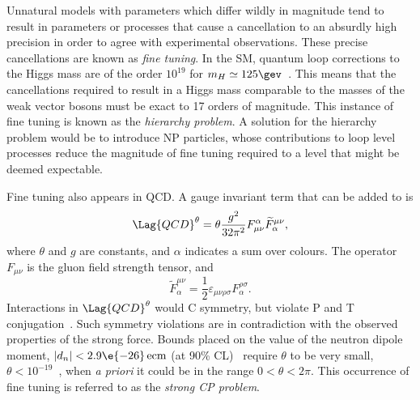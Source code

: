 Unnatural models with parameters which differ wildly in magnitude tend to
result in parameters or processes that cause a cancellation to an absurdly
high precision in order to agree with experimental observations.
These precise cancellations are known as \emph{fine tuning}.
In the SM, quantum loop corrections to the Higgs mass are of the order $10^{19}$
for $m_H\simeq125\gev$~\cite{Chatrchyan:2012ufa,Aad:2012tfa}.
This means that the cancellations required to result in a Higgs mass comparable to the masses of
the weak vector bosons must be exact to 17 orders of magnitude.
This instance of fine tuning is known as the \emph{hierarchy problem}.
A solution for the hierarchy problem would be to introduce NP particles, whose contributions to
loop level processes reduce the magnitude of fine tuning required to a level that might be deemed
expectable.

Fine tuning also appears in QCD.
A gauge invariant term that can be added to  is
\begin{equation}
  \Lag{QCD}^\theta = \theta\frac{g^2}{32\pi^2}
  F_{\mu\nu}^\alpha\widetilde F^{\mu\nu}_\alpha,
  \label{eq:strongcp}
\end{equation}
where $\theta$ and $g$ are constants, and $\alpha$ indicates a sum over colours.
The operator $F_{\mu\nu}$ is the gluon field strength tensor, and
\begin{equation}
  \widetilde F^{\mu\nu}_\alpha = \frac12\varepsilon_{\mu\nu\rho\sigma}F^{\rho\sigma}_\alpha.
\end{equation}
Interactions in $\Lag{QCD}^\theta$ would C symmetry, but violate P and T
conjugation~\cite{Peccei:2006as}.
Such symmetry violations are in contradiction with the observed properties of the strong
force.
Bounds placed on the value of the neutron dipole moment, $|d_n| <2.9\e{-26}\,\mathrm{ecm}$
(at 90\% CL)~\cite{Baker:2006ts} require $\theta$ to be very small,
$\theta<10^{-19}$~\cite{Crewther:PQref9}, when \emph{a priori} it could be in the range
$0<\theta<2\pi$.
This occurrence of fine tuning is referred to as the \emph{strong CP problem}.


